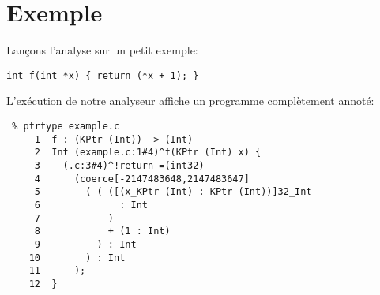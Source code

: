 \section{Exemple}

Lançons l'analyse sur un petit exemple:

\begin{verbatim}
int f(int *x) { return (*x + 1); }
\end{verbatim}

L'exécution de notre analyseur affiche un programme complètement annoté:

\begin{verbatim}
 % ptrtype example.c
     1	f : (KPtr (Int)) -> (Int)
     2	Int (example.c:1#4)^f(KPtr (Int) x) {
     3	  (.c:3#4)^!return =(int32)
     4	    (coerce[-2147483648,2147483647]
     5	      ( ( ([(x_KPtr (Int) : KPtr (Int))]32_Int
     6	            : Int
     7	          )
     8	          + (1 : Int)
     9	        ) : Int
    10	      ) : Int
    11	    );
    12	}
\end{verbatim}

